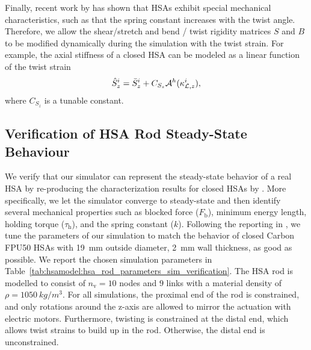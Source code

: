Finally, recent work by \citet{good2022expanding} has shown that \glspl{HSA} exhibit special mechanical characteristics, such as that the spring constant increases with the twist angle. Therefore, we allow the shear/stretch and bend / twist rigidity matrices $S$ and $B$ to be modified dynamically during the simulation with the twist strain. For example, the axial stiffness of a closed \gls{HSA} can be modeled as a linear function of the twist strain~\citep{good2022expanding}
\begin{equation}
    \hat{S}_{z}^i = \Bar{S}_{z}^i + C_{S_z} \mathcal{A}^h(\kappa_{\mathcal{L},z}^i),
\end{equation}
where $C_{S_z}$ is a tunable constant.

\subsection{Verification of HSA Rod Steady-State Behaviour}\label{sub:hsamodel:hsa_robot_simulation:verification_good}
We verify that our simulator can represent the steady-state behavior of a real \gls{HSA} by re-producing the characterization results for closed \glspl{HSA} by \citet{good2022expanding}.
More specifically, we let the simulator converge to steady-state and then identify several mechanical properties such as blocked force ($F_\mathrm{b}$), minimum energy length, holding torque ($\tau_\mathrm{h}$), and the spring constant ($k$).
Following the reporting in \citet{good2022expanding}, we tune the parameters of our simulation to match the behavior of closed Carbon FPU50 \glspl{HSA} with \SI{19}{mm} outside diameter, \SI{2}{mm} wall thickness, as good as possible. We report the chosen simulation parameters in Table~\ref{tab:hsamodel:hsa_rod_parameters_sim_verification}. 
The \gls{HSA} rod is modelled to consist of $n_\mathrm{v} = 10$ nodes and $9$ links with a material density of $\rho = \SI{1050}{kg \per m^3}$. For all simulations, the proximal end of the rod is constrained, and only rotations around the z-axis are allowed to mirror the actuation with electric motors. Furthermore, twisting is constrained at the distal end, which allows twist strains to build up in the rod. Otherwise, the distal end is unconstrained.

